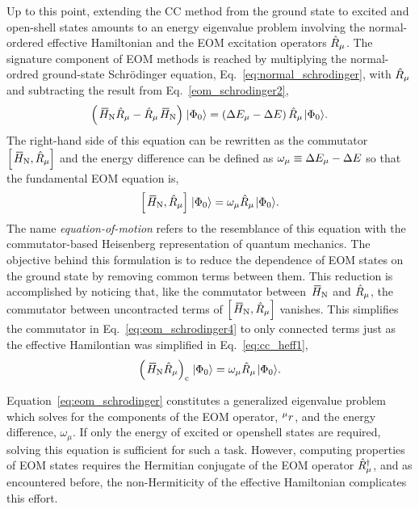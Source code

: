 \documentclass[thesis.tex]{subfiles}
\begin{document}
Up to this point, extending the CC method from the ground state to excited and open-shell states amounts to an energy eigenvalue problem involving the normal-ordered effective Hamiltonian and the EOM excitation operators $\hat{R}\hspace{-0.1pt}_{\mu}$.  The signature component of EOM methods is reached by multiplying the normal-ordred ground-state Schr\"odinger equation, Eq.\ \eqref{eq:normal_schrodinger}, with $\hat{R}\hspace{-0.1pt}_{\mu}$ and subtracting the result from Eq.\ \eqref{eom_schrodinger2},
\begin{equation} \label{eq:eom_schrodinger3}
  \left(\EHamN\Rop_{\mu} - \Rop_{\mu}\EHamN\right)\refket = \left(\Ecorr_{\mu} - \Ecorr\right)\Rop_{\mu}\refket.
\end{equation}
The right-hand side of this equation can be rewritten as the commutator $\left[ \EHamN,\Rop_{\mu} \right]$ and the energy difference can be defined as $\omega_{\mu} \equiv \Delta E_{\mu} - \Delta E$ so that the fundamental EOM equation is,
\begin{equation} \label{eq:eom_schrodinger4}
  \left[ \EHamN,\Rop_{\mu} \right]\refket = \omega_{\mu}\Rop_{\mu}\refket.
\end{equation}
The name \textit{equation-of-motion} refers to the resemblance of this equation with the commutator-based Heisenberg representation of quantum mechanics.  The objective behind this formulation is to reduce the dependence of EOM states on the ground state by removing common terms between them.  This reduction is accomplished by noticing that, like the commutator between $\EHamN$ and $\hat{R}\hspace{-0.1pt}_{\mu}$, the commutator between uncontracted terms of $\left[ \EHamN,\Rop_{\mu} \right]$ vanishes.  This simplifies the commutator in Eq.\ \eqref{eq:eom_schrodinger4} to only connected terms just as the effective Hamilontian was simplified in Eq.\ \eqref{eq:cc_heff1},
\begin{equation} \label{eq:eom_schrodinger4}
  \left( \EHamN\Rop_{\mu} \right)_{\mathrm{c}}\refket = \omega_{\mu}\Rop_{\mu}\refket.
\end{equation}

Equation\ \eqref{eq:eom_schrodinger} constitutes a generalized eigenvalue problem which solves for the components of the EOM operator, ${}^{\mu}r^{}_{}$, and the energy difference, $\omega_{\mu}$.  If only the energy of excited or openshell states are required, solving this equation is sufficient for such a task.  However, computing properties of EOM states requires the Hermitian conjugate of the EOM operator $\hat{R}\hspace{-0.1pt}^{\dagger}_{\mu}$, and as encountered before, the non-Hermiticity of the effective Hamiltonian complicates this effort.
\end{document}
